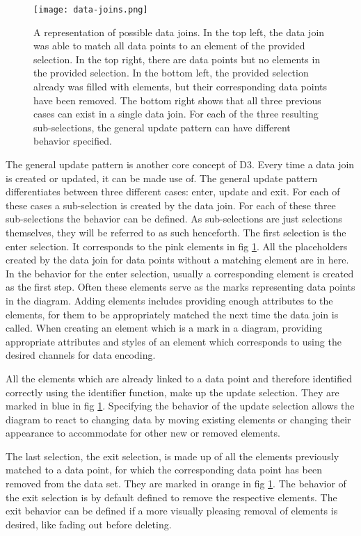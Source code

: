 \begin{figure}
    \texttt{[image: data-joins.png]}
    \captionsetup{width=0.9\textwidth}
    \caption[general-update-pattern]{A representation of possible data joins. In the top left, the data join was able to match all data points to an element of the provided selection. In the top right, there are data points but no elements in the provided selection. In the bottom left, the provided selection already was filled with elements, but their corresponding data points have been removed. The bottom right shows that all three previous cases can exist in a single data join. For each of the three resulting sub-selections, the general update pattern can have different behavior specified.}
    \label{fig:general-update-pattern}
\end{figure}

The general update pattern is another core concept of D3. Every time a data join is created or updated, it can be made use of. The general update pattern differentiates between three different cases: enter, update and exit. For each of these cases a sub-selection is created by the data join. For each of these three sub-selections the behavior can be defined. As sub-selections are just selections themselves, they will be referred to as such henceforth. The first selection is the enter selection. It corresponds to the pink elements in fig \ref{fig:general-update-pattern}. All the placeholders created by the data join for data points without a matching element are in here. In the behavior for the enter selection, usually a corresponding element is created as the first step. Often these elements serve as the marks representing data points in the diagram. Adding elements includes providing enough attributes to the elements, for them to be appropriately matched the next time the data join is called. When creating an element which is a mark in a diagram, providing appropriate attributes and styles of an element which corresponds to using the desired channels for data encoding.

All the elements which are already linked to a data point and therefore identified correctly using the identifier function, make up the update selection. They are marked in blue in fig \ref{fig:general-update-pattern}. Specifying the behavior of the update selection allows the diagram to react to changing data by moving existing elements or changing their appearance to accommodate for other new or removed elements.

The last selection, the exit selection, is made up of all the elements previously matched to a data point, for which the corresponding data point has been removed from the data set. They are marked in orange in fig \ref{fig:general-update-pattern}. The behavior of the exit selection is by default defined to remove the respective elements. The exit behavior can be defined if a more visually pleasing removal of elements is desired, like fading out before deleting.

